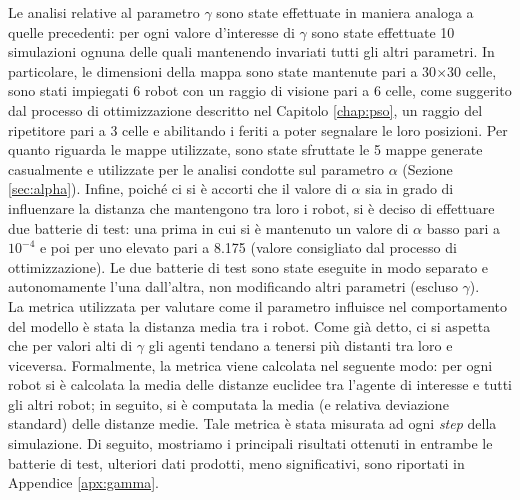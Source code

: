Le analisi relative al parametro $\gamma$ sono state effettuate in maniera analoga a quelle precedenti: per ogni valore d'interesse di $\gamma$ sono state effettuate 10 simulazioni ognuna delle quali mantenendo invariati tutti gli altri parametri.
In particolare, le dimensioni della mappa sono state mantenute pari a 30$\times$30 celle, sono stati impiegati 6 robot con un raggio di visione pari a 6 celle, come suggerito dal processo di ottimizzazione descritto nel Capitolo \ref{chap:pso}, un raggio del ripetitore pari a 3 celle e abilitando i feriti a poter segnalare le loro posizioni.
Per quanto riguarda le mappe utilizzate, sono state sfruttate le 5 mappe generate casualmente e utilizzate per le analisi condotte sul parametro $\alpha$ (Sezione \ref{sec:alpha}).
Infine, poiché ci si è accorti che il valore di $\alpha$ sia in grado di influenzare la distanza che mantengono tra loro i robot, si è deciso di effettuare due batterie di test: una prima in cui si è mantenuto un valore di $\alpha$ basso pari a $10^{-4}$ e poi per uno elevato pari a 8.175 (valore consigliato dal processo di ottimizzazione).
Le due batterie di test sono state eseguite in modo separato e autonomamente l'una dall'altra, non modificando altri parametri (escluso $\gamma$).\\
La metrica utilizzata per valutare come il parametro influisce nel comportamento del modello è stata la distanza media tra i robot. Come già detto, ci si aspetta che per valori alti di $\gamma$ gli agenti tendano a tenersi più distanti tra loro e viceversa.
Formalmente, la metrica viene calcolata nel seguente modo: per ogni robot si è calcolata la media delle distanze euclidee tra l'agente di interesse e tutti gli altri robot; in seguito, si è computata la media (e relativa deviazione standard) delle distanze medie.
Tale metrica è stata misurata ad ogni \textit{step} della simulazione.
Di seguito, mostriamo i principali risultati ottenuti in entrambe le batterie di test, ulteriori dati prodotti, meno significativi, sono riportati in Appendice \ref{apx:gamma}.

